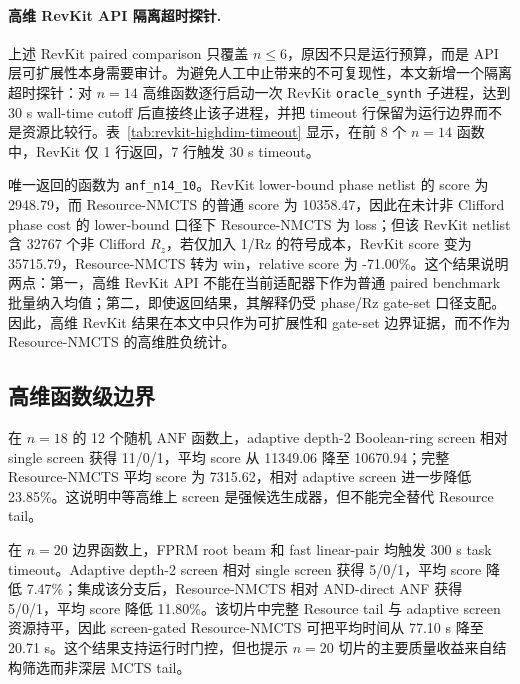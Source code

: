\documentclass[UTF8,fontset=macnew,11pt]{ctexart}
\newcommand{\method}{Resource-NMCTS}
\newcommand{\screen}{Boolean-ring screen}
\newcommand{\anf}{\ensuremath{\mathrm{ANF}}}
\newcommand{\mcts}{\ensuremath{\mathrm{MCTS}}}
\begin{document}
\paragraph{高维 RevKit API 隔离超时探针.}
上述 RevKit paired comparison 只覆盖 $n\leq6$，原因不只是运行预算，而是 API 层可扩展性本身需要审计。为避免人工中止带来的不可复现性，本文新增一个隔离超时探针：对 $n=14$ 高维函数逐行启动一次 RevKit \texttt{oracle\_synth} 子进程，达到 30 s wall-time cutoff 后直接终止该子进程，并把 timeout 行保留为运行边界而不是资源比较行。表~\ref{tab:revkit-highdim-timeout} 显示，在前 8 个 $n=14$ 函数中，RevKit 仅 1 行返回，7 行触发 30 s timeout。

唯一返回的函数为 \texttt{anf\_n14\_10}。RevKit lower-bound phase netlist 的 score 为 2948.79，而 \method{} 的普通 score 为 10358.47，因此在未计非 Clifford phase cost 的 lower-bound 口径下 \method{} 为 loss；但该 RevKit netlist 含 32767 个非 Clifford $R_z$，若仅加入 1/Rz 的符号成本，RevKit score 变为 35715.79，\method{} 转为 win，relative score 为 -71.00\%。这个结果说明两点：第一，高维 RevKit API 不能在当前适配器下作为普通 paired benchmark 批量纳入均值；第二，即使返回结果，其解释仍受 phase/Rz gate-set 口径支配。因此，高维 RevKit 结果在本文中只作为可扩展性和 gate-set 边界证据，而不作为 Resource-NMCTS 的高维胜负统计。

\begin{table}[H]
\centering
\small
\caption{$n=14$ RevKit Python \texttt{oracle\_synth} 隔离超时探针。Timeout 行没有线路资源，不能参与资源均值比较。}
\label{tab:revkit-highdim-timeout}

\end{table}

\subsection{高维函数级边界}

在 $n=18$ 的 12 个随机 \anf{} 函数上，adaptive depth-2 \screen{} 相对 single screen 获得 11/0/1，平均 score 从 11349.06 降至 10670.94；完整 \method{} 平均 score 为 7315.62，相对 adaptive screen 进一步降低 23.85\%。这说明中等高维上 screen 是强候选生成器，但不能完全替代 Resource tail。

在 $n=20$ 边界函数上，FPRM root beam 和 fast linear-pair 均触发 300 s task timeout。Adaptive depth-2 screen 相对 single screen 获得 5/0/1，平均 score 降低 7.47\%；集成该分支后，\method{} 相对 AND-direct ANF 获得 5/0/1，平均 score 降低 11.80\%。该切片中完整 Resource tail 与 adaptive screen 资源持平，因此 screen-gated \method{} 可把平均时间从 77.10 s 降至 20.71 s。这个结果支持运行时门控，但也提示 $n=20$ 切片的主要质量收益来自结构筛选而非深层 \mcts{} tail。
\end{document}
